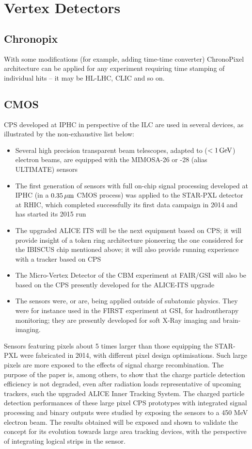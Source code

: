 \section{Vertex Detectors}
\subsection{Chronopix}
     With some modifications (for example, adding time-time converter) ChronoPixel architecture can be applied for any experiment requiring time stamping of individual hits -- it may be HL-LHC, CLIC and so on.

\subsection{CMOS}
CPS developed at IPHC in perspective of the ILC are used in several
devices, as illustrated by the non-exhaustive list below:
\begin{itemize}
\item Several high precision transparent beam telescopes, adapted to
	($<\unit[1]{GeV}$) electron beams, are equipped with the MIMOSA-26 or
	-28 (alias ULTIMATE) sensors
\item The first generation of sensors with full on-chip signal processing
	developed at IPHC (in a $\unit[0.35]{\mu m}$ CMOS process) was applied to the
	STAR-PXL detector at RHIC, which completed successfully its first
	data campaign in 2014 and has started its 2015 run
\item The upgraded ALICE ITS will be the next equipment based on CPS;
	it will provide insight of a token ring architecture pioneering
	the one considered for the IBISCUS chip mentioned above; it will
	also provide running experience with a tracker based on CPS
\item The Micro-Vertex Detector of the CBM experiment at FAIR/GSI will
	also be based on the CPS presently developed for the ALICE-ITS
	upgrade
\item The sensors were, or are, being applied outside of subatomic physics.
	They were for instance used in the FIRST experiment at GSI, for
	hadrontherapy monitoring; they are presently developed for soft
	X-Ray imaging and brain-imaging.
\end{itemize}

Sensors featuring pixels about 5 times larger than those equipping the STAR-PXL were fabricated in 2014, with different pixel design optimisations. Such large pixels are more exposed to the effects of signal charge recombination. The purpose of the paper is, among others, to show that the charge particle detection efficiency is not degraded, even after radiation loads representative of upcoming trackers, such the upgraded ALICE Inner Tracking System. The charged particle detection performances of these large pixel CPS prototypes with integrated signal processing and binary outputs were studied by exposing the sensors to a 450 MeV electron beam. The results obtained will be exposed
and shown to validate the concept for its evolution towards large area tracking devices, with the perspective of integrating logical strips in the sensor.

